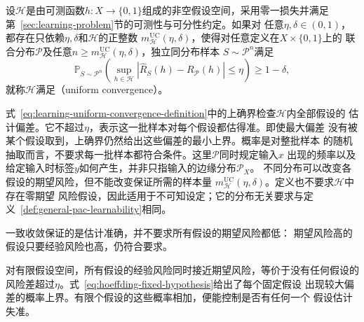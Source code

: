 \begin{definition}[一致收敛]
\label{def:learning-uniform-convergence}
设$\mathcal H$是由可测函数$h:X\to\{0,1\}$组成的非空假设空间，采用零一损失并满足
第~\ref{sec:learning-problem}节的可测性与可分性约定。如果对
任意$\eta,\delta\in(0,1)$，都存在只依赖$\eta,\delta$和$\mathcal H$的正整数
$m_{\mathcal H}^{\mathrm{UC}}(\eta,\delta)$，使得对任意定义在$X\times\{0,1\}$上的
联合分布$\mathcal P$及任意$n\geq m_{\mathcal H}^{\mathrm{UC}}(\eta,\delta)$，独立同分布样本
$S\sim\mathcal P^n$满足
\begin{equation}
 \mathbb P_{S\sim\mathcal P^n}\left(
   \sup_{h\in\mathcal H}|\hat R_S(h)-R_{\mathcal P}(h)|\leq\eta
 \right)\geq1-\delta,
 \label{eq:learning-uniform-convergence-definition}
\end{equation}
就称$\mathcal H$满足（uniform convergence）。
\end{definition}

式~\eqref{eq:learning-uniform-convergence-definition}中的上确界检查$\mathcal H$内全部假设的
估计偏差。它不超过$\eta$，表示这一批样本对每个假设都估得准。即使最大偏差
没有被某个假设取到，上确界仍然给出这些偏差的最小上界。概率是对整批样本
的随机抽取而言，不要求每一批样本都符合条件。这里$\mathcal P$同时规定输入$x$
出现的频率以及给定输入时标签$y$如何产生，并非只指输入的边缘分布$\mathcal P_X$。
不同分布可以改变各假设的期望风险，但不能改变保证所需的样本量
$m_{\mathcal H}^{\mathrm{UC}}(\eta,\delta)$。定义也不要求$\mathcal H$中存在零期望
风险假设，因此适用于不可知设定；它的分布无关要求与定义~\ref{def:general-pac-learnability}相同。

一致收敛保证的是估计准确，并不要求所有假设的期望风险都低：
期望风险高的假设只要经验风险也高，仍符合要求。

对有限假设空间，所有假设的经验风险同时接近期望风险，等价于没有任何假设的
风险差超过$\eta$。式~\eqref{eq:hoeffding-fixed-hypothesis}给出了每个固定假设
出现较大偏差的概率上界。有限个假设的这些概率相加，便能控制是否有任何一个
假设估计失准。

